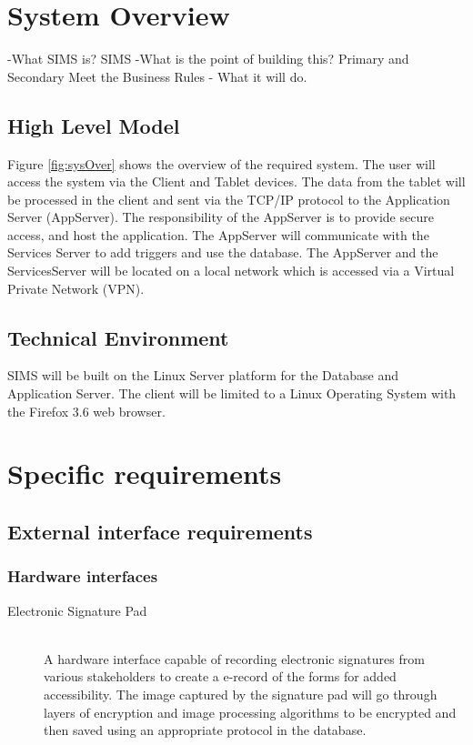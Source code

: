 \documentclass{journal}
\begin{document}
\clearpage

\section{System Overview}

-What SIMS is?
SIMS 
-What is the point of building this?
	Primary and Secondary
	Meet the Business Rules 
- What it will do.


\subsection{High Level Model}

Figure \ref{fig:sysOver} shows the overview of the required system. The user will access the system via the Client and Tablet devices. The data from the tablet will be processed in the client and sent via the TCP/IP protocol to the Application Server (AppServer). The responsibility of the AppServer is to provide secure access, and host the application. The AppServer will communicate with the Services Server to add triggers and use the database. The AppServer and the ServicesServer will be located on a local network which is accessed via a Virtual Private Network (VPN).


\subsection{Technical Environment}

SIMS will be built on the Linux Server platform for the Database and Application Server. The client will be limited to a Linux Operating System with the Firefox 3.6 web browser.  


\section{Specific requirements}
\subsection{External interface requirements}
\subsubsection{Hardware interfaces}

\begin{description}
\item[Electronic Signature Pad]\hfill \\
		A hardware interface capable of recording electronic signatures from various stakeholders to create a e-record of the forms for added accessibility. The image captured by the signature pad will go through layers of encryption and image processing algorithms to be encrypted and then saved using an appropriate protocol in the database. 
		\end{description}
\end{document}
